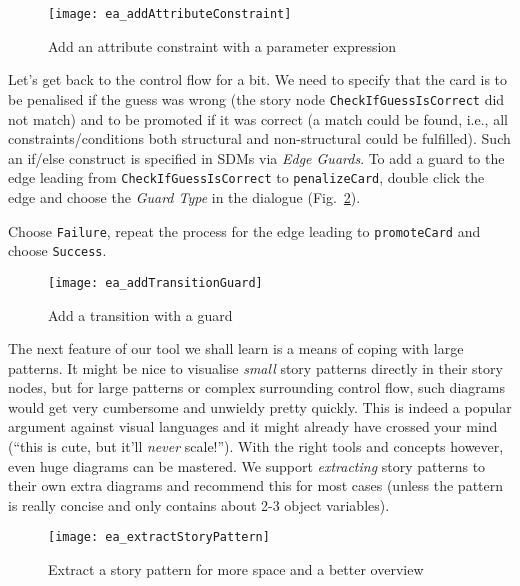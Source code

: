 \begin{figure}[htbp]
\begin{center}
  \texttt{[image: ea\_addAttributeConstraint]}
  \caption{Add an attribute constraint with a parameter expression}
  \label{fig:sdm_check_att_constraint}
\end{center}
\end{figure}

Let's get back to the control flow for a bit.  We need to specify that the card is to be penalised if the guess was wrong (the story node
\texttt{Check\-If\-Guess\-Is\-Correct} did not match) and to be promoted if it was correct (a match could be found, i.e., all constraints/conditions both
 structural and non-structural could be fulfilled). Such an if/else construct is specified in SDMs via \emph{Edge Guards}. To add a guard to
the edge leading from \texttt{Check\-If\-Guess\-Is\-Correct} to \texttt{penalize\-Card}, double click the edge and choose the \emph{Guard Type}
in the dialogue (Fig.~\ref{fig:sdm_check_guard}).

Choose \texttt{Failure}, repeat the process for the edge leading to \texttt{promoteCard} and choose \texttt{Success}.

\begin{figure}[htbp]
\begin{center}
  \texttt{[image: ea\_addTransitionGuard]}
  \caption{Add a transition with a guard}
  \label{fig:sdm_check_guard}
\end{center}
\end{figure}


The next feature of our tool we shall learn is a means of coping with large patterns. It might be nice to visualise \emph{small} story patterns directly in
their story nodes, but for large patterns or complex surrounding control flow, such diagrams would get very cumbersome and unwieldy pretty quickly.  This is
indeed a popular argument against visual languages and it might already have crossed your mind (``this is cute, but it'll \emph{never} scale!''). With the right
tools and concepts however, even huge diagrams can be mastered. We support \emph{extracting} story patterns to their own extra
diagrams and recommend this for most cases (unless the pattern is really concise and only contains about 2-3 object variables).

\begin{figure}[htbp]
\begin{center}
  \texttt{[image: ea\_extractStoryPattern]}
  \caption{Extract a story pattern for more space and a better overview}
  \label{fig:sdm_check_extract_storypattern}
\end{center}
\end{figure}

